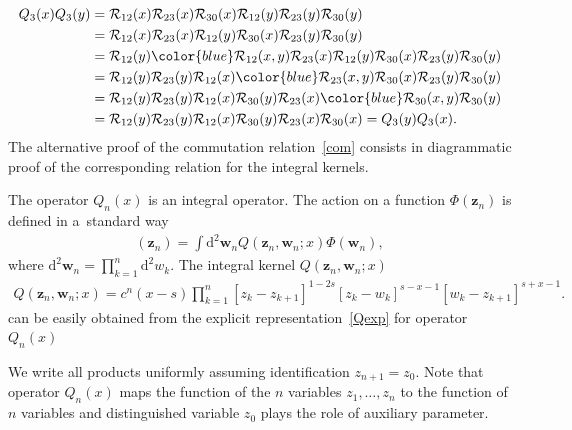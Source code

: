 \documentclass[10pt,a4paper]{amsart}
\newcommand{\blue}{\color{blue}}
\numberwithin{equation}{section}
\begin{document}
\begin{align*}
Q_3( x) Q_3( y) & =
\mathcal{R}_{12}(x) \mathcal{R}_{23}(x) \mathcal{R}_{30}(x)
\mathcal{R}_{12}(y) \mathcal{R}_{23}(y) \mathcal{R}_{30}(y) \\
& =
\mathcal{R}_{12}(x) \mathcal{R}_{23}(x)
\mathcal{R}_{12}(y) \mathcal{R}_{30}(x)
\mathcal{R}_{23}(y) \mathcal{R}_{30}(y) \\
& =
\mathcal{R}_{12}(y) {\blue \mathcal{R}_{12}(x,y)} \mathcal{R}_{23}(x)
\mathcal{R}_{12}(y) \mathcal{R}_{30}(x)
\mathcal{R}_{23}(y) \mathcal{R}_{30}(y) \\
& =
\mathcal{R}_{12}(y) \mathcal{R}_{23}(y)
\mathcal{R}_{12}(x) {\blue \mathcal{R}_{23}(x,y)} \mathcal{R}_{30}(x)
\mathcal{R}_{23}(y) \mathcal{R}_{30}(y) \\
& =
\mathcal{R}_{12}(y) \mathcal{R}_{23}(y)
\mathcal{R}_{12}(x) \mathcal{R}_{30}(y)
\mathcal{R}_{23}(x) {\blue \mathcal{R}_{30}(x,y)} \mathcal{R}_{30}(y) \\
& =
\mathcal{R}_{12}(y) \mathcal{R}_{23}(y)
\mathcal{R}_{12}(x) \mathcal{R}_{30}(y)
\mathcal{R}_{23}(x) \mathcal{R}_{30}(x) = Q_3( y) Q_3( x) .
\end{align*}
The alternative proof of the commutation relation~\eqref{com}
consists in diagrammatic proof of the corresponding relation
for the integral kernels.

The operator $Q_n(x)$ is an integral operator.
The action on a function $\Phi(\bm z_n)$ is defined in a~standard way
\begin{align*}
[Q_n( x) \Phi](\bm z_n) = \int \mathrm{d}^{2} \bm w_n
 Q(\bm z_n,\bm w_n;x) \Phi(\bm w_n) ,
\end{align*}
where $\mathrm{d}^{2}\bm w_n = \prod_{k=1}^{n} \mathrm{d}^2 w_k$.
The integral kernel $Q(\bm z_n,\bm w_n;x)$
\begin{align*}
Q(\bm z_n,\bm w_n;x) = c^n(x-s)
\prod_{k=1}^{n}
[z_k-z_{k+1}]^{1-2s}
[z_k-w_k]^{s-x-1}[w_k-z_{k+1}]^{s+x-1} .
\end{align*}
can be easily obtained
from the explicit representation~\eqref{Qexp} for operator $Q_n(x)$


We write all products uniformly assuming identification $z_{n+1}=z_0$.
Note that operator $Q_n( x)$ maps the function of the $n$ variables
$z_1 ,\dots ,z_n$ to the function of $n$ variables and
distinguished variable $z_0$ plays the role of auxiliary parameter.
\end{document}
